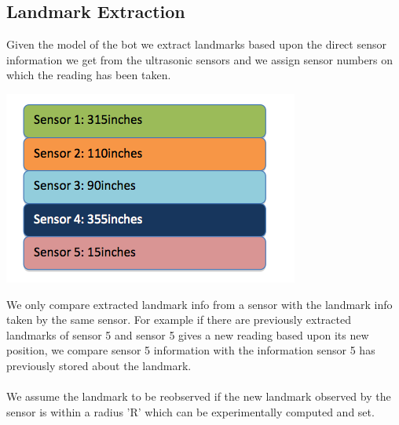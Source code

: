 \documentclass[12pt]{article}
\begin{document}
\subsection{Landmark Extraction}
Given the model of the bot we extract landmarks based upon the direct sensor information we get from the ultrasonic sensors and we assign sensor numbers on which the reading has been taken.\\
\begin{center} \includegraphics[scale=0.4]{pic1} \end{center}
We only compare extracted landmark\cite{landmark} info from a sensor with the landmark info taken by the same sensor. For example if there are previously extracted landmarks of sensor 5 and sensor 5 gives a new reading based upon its new position, we compare sensor 5 information with the information sensor 5 has previously stored about the landmark\cite{sonar}.\\
\\
We assume the landmark to be reobserved if the new landmark observed by the sensor is within a radius 'R' which can be experimentally computed and set.\\
\\
\end{document}
